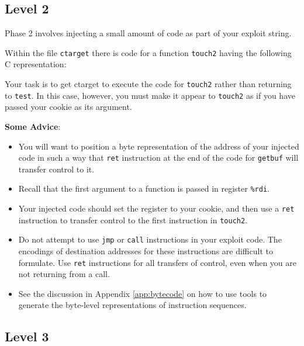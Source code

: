 \documentclass[11pt]{article}
\newcommand{\reg}[1]{\textrm{\texttt{\%#1}}}
\newcommand{\rdireg}{\reg{rdi}}
\newenvironment{ccode}%
{\small}%
{}
\begin{document}
\subsection{Level 2}

Phase 2 involves injecting a small amount of code as part of your exploit string.

Within the file {\tt ctarget} there is code for a function {\tt touch2}
having the following C representation:

\begin{ccode}

\end{ccode}

Your task is to get {\sc ctarget} to execute the
code for {\tt touch2} rather than returning to {\tt test}.  In this
case, however, you must make it appear to {\tt touch2} as if you have
passed your cookie as its argument.

{\bf Some Advice}:
\begin{itemize}

\item You will want to position a byte representation of the address
  of your injected code in such a way that {\tt ret} instruction at
  the end of the code for \texttt{getbuf} will transfer control to it.

\item Recall that the first argument to a function is passed in
  register \rdireg{}.

\item Your injected code should set the register to your cookie, and
  then use a \texttt{ret} instruction to transfer control to the first
  instruction in \texttt{touch2}.

\item Do not attempt to use {\tt jmp} or {\tt call} instructions in
  your exploit code.  The encodings of destination addresses for these
  instructions are difficult to formulate.  Use {\tt ret} instructions for
  all transfers of control, even when you are not returning from a
  call.

\item See the discussion in Appendix \ref{app:bytecode}
on how to use tools to generate the byte-level representations of instruction sequences.
\end{itemize}

\subsection{Level 3}
\end{document}
